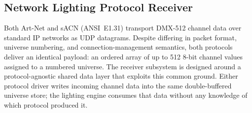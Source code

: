 \subsection{Network Lighting Protocol Receiver}
\label{sec:net_receiver}

Both Art-Net and \ac{sACN} (ANSI~E1.31) transport \ac{DMX}-512 channel data over standard \ac{IP} networks as \ac{UDP} datagrams.
Despite differing in packet format, universe numbering, and connection-management semantics, both protocols deliver an identical payload: an ordered array of up to \num{512} 8-bit channel values assigned to a numbered universe.
The receiver subsystem is designed around a protocol-agnostic shared data layer that exploits this common ground.
Either protocol driver writes incoming channel data into the same double-buffered universe store; the lighting engine consumes that data without any knowledge of which protocol produced it.

